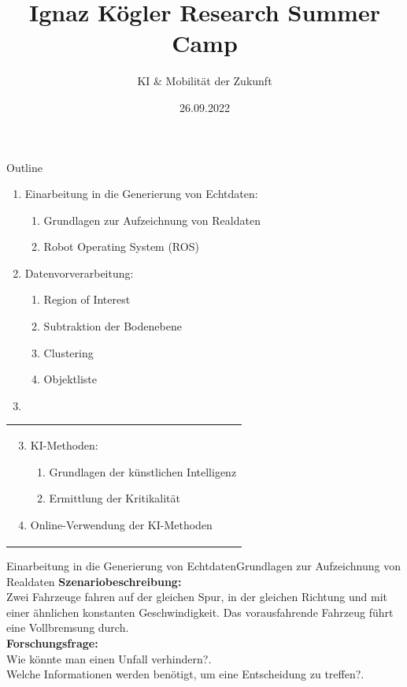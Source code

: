 \documentclass[169, handout	]{THIbeamer} %
\title{Ignaz Kögler Research Summer Camp}
\subtitle{KI \& Mobilität der Zukunft}
\date{26.09.2022}
\begin{document}
	\begin{frame}[plain]
		\maketitle
	\end{frame}
	\begin{frame}{Outline}
		\begin{minipage}{0.4\textwidth}
			\begin{enumerate}
				\item Einarbeitung in die Generierung von Echtdaten:
				\begin{enumerate}
					\item Grundlagen zur Aufzeichnung von Realdaten
					\item Robot Operating System (ROS)
				\end{enumerate}
				\item Datenvorverarbeitung:
				\begin{enumerate}
					\item Region of Interest
					\item Subtraktion der Bodenebene
					\item Clustering
					\item Objektliste
				\end{enumerate}
			\item[]
			\end{enumerate}
		\end{minipage}%
		\hfill
		\begin{minipage}{0.5\textwidth}
		\begin{tabular}{p{\textwidth}}
			\begin{enumerate}
				\setcounter{enumi}{2}	
				\item KI-Methoden: 				
				\begin{enumerate}
					\item Grundlagen der künstlichen Intelligenz					
					\item Ermittlung der Kritikalität	
				\end{enumerate}	
				\item Online-Verwendung der KI-Methoden
			\end{enumerate}
		\end{tabular}
		\end{minipage}%
	\end{frame}
\begin{frame}{Einarbeitung in die Generierung von Echtdaten}{Grundlagen zur Aufzeichnung von Realdaten}
	\textbf{Szenariobeschreibung:}\\
	Zwei Fahrzeuge fahren auf der gleichen Spur, in der gleichen Richtung und mit einer ähnlichen konstanten Geschwindigkeit. Das vorausfahrende Fahrzeug führt eine Vollbremsung durch.\\
	\textbf{Forschungsfrage:} \\
	Wie könnte man einen Unfall verhindern?.\\
Welche Informationen werden benötigt, um eine Entscheidung zu treffen?.
\end{frame}
\end{document}
